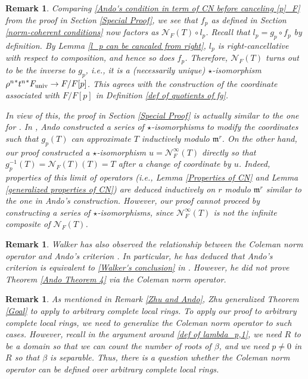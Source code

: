 \documentclass[12pt]{article}
\newtheorem{remark}[theorem]{Remark}
\theoremstyle{definition}
\def\CN{\mathscr{N}}
\def\m{\mathfrak{m}}
\begin{document}
    \begin{remark}
        Comparing \eqref{Ando's condition in term of CN before canceling [p]_F} from the proof in Section \ref{Special Proof}, we see that $f_p$ as defined in Section \ref{norm-coherent conditions} now factors as $\CN_F(T) \circ l_p$. Recall that $l_p = g_p \circ f_p$ by definition. By Lemma \ref{l_p can be cancaled from right}, $l_p$ is right-cancellative with respect to composition, and hence so does $f_p$. Therefore, $\CN_F(T)$ turns out to be the inverse to $g_p$, i.e., it is a (necessarily unique) $\star$-isomorphism ${\rho^n}^*{t^n}^*F_{\rm univ} \to F/F[p]$. This agrees with the construction of the coordinate associated with $F/F[p]$ in Definition \ref{def of quotients of fg}. \par 
        In view of this, the proof in Section \ref{Special Proof} is actually similar to the one for \cite[Theorem 2.6.4]{And95}. In \cite[Theorem 2.6.4]{And95}, Ando constructed a series of $\star$-isomorphisms to modify the coordinates such that $g_p(T)$ can approximate $T$ inductively modulo $\m^r$. On the other hand, our proof constructed a $\star$-isomorphism $u = \CN_F^\infty(T)$ directly so that $g_p^{-1}(T) = \CN_F(T)(T) = T$ after a change of coordinate by $u$. Indeed, properties of this limit of operators (i.e., Lemma \ref{Properties of CN} and Lemma \ref{generalized properties of CN}) are deduced inductively on $r$ modulo $\m^r$ similar to the one in Ando's construction. However, our proof cannot proceed by constructing a series of $\star$-isomorphisms, since $\CN_F^\infty(T)$ is not the infinite composite of $\CN_F(T)$. 
    \end{remark}
    \begin{remark}
        Walker has also observed the relationship between the Coleman norm operator and Ando's criterion \cite[Chapter 5]{Wal08}. In particular, he has deduced that Ando's criterion is equivalent to \eqref{Walker's conclusion} in \cite[Lemma 5.0.5 and (5.0.10)]{Wal08}. However, he did not prove Theorem \ref{Ando Theorem 4} via the Coleman norm operator. 
    \end{remark}
    \begin{remark}
        As mentioned in Remark \ref{Zhu and Ando}, Zhu generalized Theorem \ref{Goal} to apply to arbitrary complete local rings. To apply our proof to arbitrary complete local rings, we need to generalize the Coleman norm operator to such cases. However, recall in the argument around \eqref{def of lambda_p,1}, we need $R$ to be a domain so that we can count the number of roots of $\beta$, and we need $p \neq 0$ in $R$ so that $\beta$ is separable. Thus, there is a question whether the Coleman norm operator can be defined over arbitrary complete local rings. 
    \end{remark}
\end{document}
